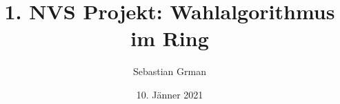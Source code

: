 \documentclass{article}
\begin{document}
\clearpage
\thispagestyle{empty}
\author{Sebastian Grman}
\date{10. Jänner 2021}
\title{1. NVS Projekt: Wahlalgorithmus im Ring}
\maketitle
\clearpage
{}
\tableofcontents






\newpage
\printbibliography
\end{document}
